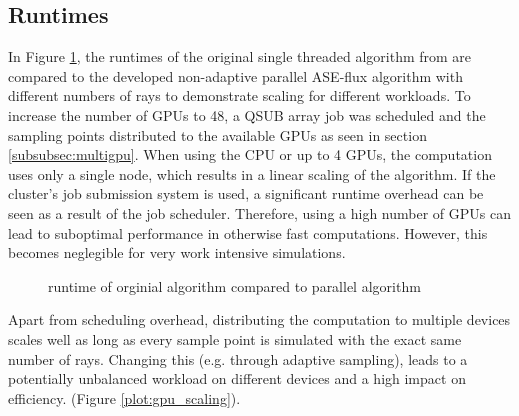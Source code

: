 \subsection{Runtimes}
In Figure \ref{plot:runtime}, the runtimes of the original single threaded
algorithm from \cite{ASE2010} are compared to the developed non-adaptive
parallel ASE-flux algorithm with different numbers of rays to demonstrate
scaling for different workloads. To increase the number of GPUs to 48, a QSUB
array job was scheduled and the sampling points distributed to the available
GPUs as seen in section \ref{subsubsec:multigpu}.  When using the CPU or up to 4
GPUs, the computation uses only a single node, which results in a linear scaling
of the algorithm. If the cluster's job submission system is used, a significant
runtime overhead can be seen as a result of the job scheduler. Therefore, using
a high number of GPUs can lead to suboptimal performance in otherwise fast
computations. However, this becomes neglegible for very work intensive
simulations.
\begin{figure}[H]
  \centerline{
    }
  \caption{runtime of orginial algorithm compared to parallel algorithm}
  \label{plot:runtime}
\end{figure}
Apart from scheduling overhead, distributing the computation to multiple devices
scales well as long as every sample point is simulated with the exact same
number of rays. Changing this (e.g. through adaptive sampling), leads to a
potentially unbalanced workload on different devices and a high impact on efficiency.
(Figure \ref{plot:gpu_scaling}).
